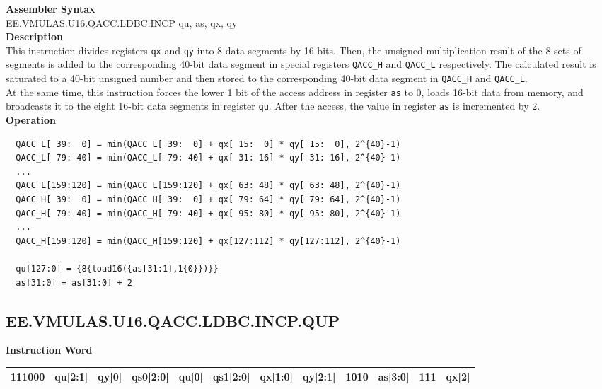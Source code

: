\textbf{Assembler Syntax} \\
EE.VMULAS.U16.QACC.LDBC.INCP qu, as, qx, qy \\
\textbf{Description} \\
This instruction divides registers \lstinline{qx} and \lstinline{qy} into 8 data segments by 16 bits. Then, the unsigned multiplication result of the 8 sets of segments is added to the corresponding 40-bit data segment in special registers \lstinline{QACC_H} and \lstinline{QACC_L} respectively. The calculated result is saturated to a 40-bit unsigned number and then stored to the corresponding 40-bit data segment in \lstinline{QACC_H} and \lstinline{QACC_L}.\\
At the same time, this instruction forces the lower 1 bit of the access address in register \lstinline{as} to 0, loads 16-bit data from memory, and broadcasts it to the eight 16-bit data segments in register \lstinline{qu}. After the access, the value in register \lstinline{as} is incremented by 2.\\
\textbf{Operation}
\begin{lstlisting}
  QACC_L[ 39:  0] = min(QACC_L[ 39:  0] + qx[ 15:  0] * qy[ 15:  0], 2^{40}-1)
  QACC_L[ 79: 40] = min(QACC_L[ 79: 40] + qx[ 31: 16] * qy[ 31: 16], 2^{40}-1)
  ...
  QACC_L[159:120] = min(QACC_L[159:120] + qx[ 63: 48] * qy[ 63: 48], 2^{40}-1)
  QACC_H[ 39:  0] = min(QACC_H[ 39:  0] + qx[ 79: 64] * qy[ 79: 64], 2^{40}-1)
  QACC_H[ 79: 40] = min(QACC_H[ 79: 40] + qx[ 95: 80] * qy[ 95: 80], 2^{40}-1)
  ...
  QACC_H[159:120] = min(QACC_H[159:120] + qx[127:112] * qy[127:112], 2^{40}-1)

  qu[127:0] = {8{load16({as[31:1],1{0}})}}
  as[31:0] = as[31:0] + 2
\end{lstlisting}

\clearpage
\subsection{EE.VMULAS.U16.QACC.LDBC.INCP.QUP}\label{instruction:EEVMULASU16QACCLDBCINCPQUP}
\setlength\tabcolsep{6pt}
\textbf{Instruction Word} \\
\begin{tabular}{|c|c|c|c|c|c|c|c|c|c|c|c|}
	\hline
	111000 & qu[2:1] & qy[0] & qs0[2:0] & qu[0] & qs1[2:0] & qx[1:0] & qy[2:1] & 1010 & as[3:0] & 111 & qx[2] \\
	\hline
\end{tabular}

